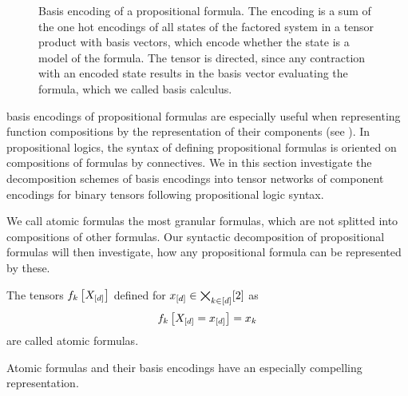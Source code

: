 \begin{figure}[t]
    \begin{center}
        
    \end{center}
    \caption{Basis encoding of a propositional formula.
    The encoding is a sum of the one hot encodings of all states of the factored system in a tensor product with basis vectors, which encode whether the state is a model of the formula.
    The tensor is directed, since any contraction with an encoded state results in the basis vector evaluating the formula, which we called basis calculus.
    }
    \label{fig:formulabencoding}
\end{figure}



basis encodings of propositional formulas are especially useful when representing function compositions by the representation of their components (see ).
In propositional logics, the syntax of defining propositional formulas is oriented on compositions of formulas by connectives. %
We in this section investigate the decomposition schemes of basis encodings into tensor networks of component encodings for binary tensors following propositional logic syntax.


We call atomic formulas the most granular formulas, which are not splitted into compositions of other formulas.
Our syntactic decomposition of propositional formulas will then investigate, how any propositional formula can be represented by these.

\begin{definition}
    The tensors $f_{k}\left[X_{[d]}\right]$ defined for $x_{[d]}\in\bigtimes_{k\in[d]}[2]$ as
    \begin{align*}
        f_{k}\left[X_{[d]}=x_{[d]}\right]
        = x_{k}
    \end{align*}
    are called atomic formulas.
\end{definition}

Atomic formulas and their basis encodings have an especially compelling representation.


